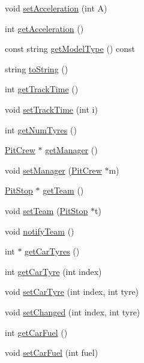 \begin{DoxyCompactItemize}
\item 
void \mbox{\hyperlink{class_car_aa3f0bd8ed0bd0ab70540f1ea9f9c3058}{set\+Acceleration}} (int A)
\item 
int \mbox{\hyperlink{class_car_a65f1e6a41427135fe69004642f485076}{get\+Acceleration}} ()
\item 
const string \mbox{\hyperlink{class_car_a92753a8c68d5e0681dafd89db2e6e660}{get\+Model\+Type}} () const
\item 
string \mbox{\hyperlink{class_car_a7989fe6e09bb5dfc1b7de3d5f275b5ae}{to\+String}} ()
\item 
int \mbox{\hyperlink{class_car_a63dd14b9889f022373971846b088f65f}{get\+Track\+Time}} ()
\item 
void \mbox{\hyperlink{class_car_a744626ffab217629a2e9a35837531a44}{set\+Track\+Time}} (int i)
\item 
int \mbox{\hyperlink{class_car_a37d6bc64d09b030dacd25de5f0fa0a64}{get\+Num\+Tyres}} ()
\item 
\mbox{\hyperlink{class_pit_crew}{Pit\+Crew}} $\ast$ \mbox{\hyperlink{class_car_a225edc19422a1c521b4259abc363c046}{get\+Manager}} ()
\item 
void \mbox{\hyperlink{class_car_a10d9ba320f5efd4cf233d50d10e2107c}{set\+Manager}} (\mbox{\hyperlink{class_pit_crew}{Pit\+Crew}} $\ast$m)
\item 
\mbox{\hyperlink{class_pit_stop}{Pit\+Stop}} $\ast$ \mbox{\hyperlink{class_car_a597150e71ff1eb914f82eee7e545cddf}{get\+Team}} ()
\item 
void \mbox{\hyperlink{class_car_ae552ed5a2d8660c27ceb67c8454a48ae}{set\+Team}} (\mbox{\hyperlink{class_pit_stop}{Pit\+Stop}} $\ast$t)
\item 
void \mbox{\hyperlink{class_car_abbf050e461e2e56dae11e89c8efda7af}{notify\+Team}} ()
\item 
int $\ast$ \mbox{\hyperlink{class_car_aabb17902a6b0770523779bd2d1ab9fdd}{get\+Car\+Tyres}} ()
\item 
int \mbox{\hyperlink{class_car_aa025fcec65db2ad7d696840e64c9451c}{get\+Car\+Tyre}} (int index)
\item 
void \mbox{\hyperlink{class_car_a87fc66f728b131aeb0748a416984ad93}{set\+Car\+Tyre}} (int index, int tyre)
\item 
void \mbox{\hyperlink{class_car_a2248a180b5fdb272746f93d7956d11d3}{set\+Changed}} (int index, int tyre)
\item 
int \mbox{\hyperlink{class_car_a7268dbaecbc6bca28bbe043d3a78a3fb}{get\+Car\+Fuel}} ()
\item 
void \mbox{\hyperlink{class_car_a4630826e2d1b4972e9c946faa6c58f19}{set\+Car\+Fuel}} (int fuel)

\end{DoxyCompactItemize}

